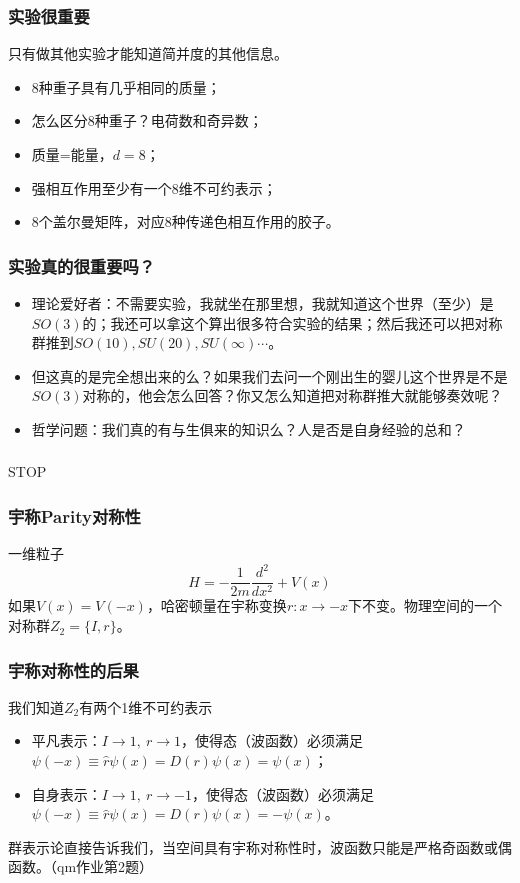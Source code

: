 \documentclass[CJK]{beamer}
\begin{document}
\begin{frame}
\frametitle{\bch 实验很重要 \ech}
\bch
只有做其他实验才能知道简并度的其他信息。
\begin{itemize}
\item 8种重子具有几乎相同的质量；
\item 怎么区分8种重子？电荷数和奇异数；
\item 质量=能量，$d=8$；
\item 强相互作用至少有一个8维不可约表示；
\item 8个盖尔曼矩阵，对应8种传递色相互作用的胶子。
\end{itemize}
\ech
\end{frame}


\begin{frame}
\frametitle{\bch 实验真的很重要吗？ \ech}
\bch
\begin{itemize}
\item
理论爱好者：不需要实验，我就坐在那里想，我就知道这个世界（至少）是$SO(3)$的；我还可以拿这个算出很多符合实验的结果；然后我还可以把对称群推到$SO(10),SU(20),SU(\infty) \cdots$。
\item
但这真的是完全想出来的么？如果我们去问一个刚出生的婴儿这个世界是不是$SO(3)$对称的，他会怎么回答？你又怎么知道把对称群推大就能够奏效呢？
\item
哲学问题：我们真的有与生俱来的知识么？人是否是自身经验的总和？
\end{itemize}
\ech
\end{frame}

\begin{frame}
\frametitle{\bch  \ech}
\bch
STOP
\ech
\end{frame}


\begin{frame}
\frametitle{\bch 宇称Parity对称性\ech}
\bch
一维粒子
$$
H = -\frac{1}{2m} \frac{d^2}{dx^2} + V(x)
$$
如果$V(x) = V(-x)$，哈密顿量在宇称变换$r : x \to -x$下不变。物理空间的一个对称群$Z_2 = \{I ,r\}$。
\ech
\end{frame}

\begin{frame}
\frametitle{\bch 宇称对称性的后果\ech}
\bch
我们知道$Z_2$有两个1维不可约表示
\begin{itemize}
\item 平凡表示：$I \to 1,\ r \to 1$，使得态（波函数）必须满足$\psi(-x) \equiv \hat r \psi(x) = D(r) \psi(x) = \psi(x)$；
\item 自身表示：$I \to 1,\ r \to -1$，使得态（波函数）必须满足$\psi(-x) \equiv \hat r \psi(x) = D(r) \psi(x) = -\psi(x)$。
\end{itemize}
群表示论直接告诉我们，当空间具有宇称对称性时，波函数只能是严格奇函数或偶函数。（qm作业第2题）

\ech
\end{frame}
\end{document}
